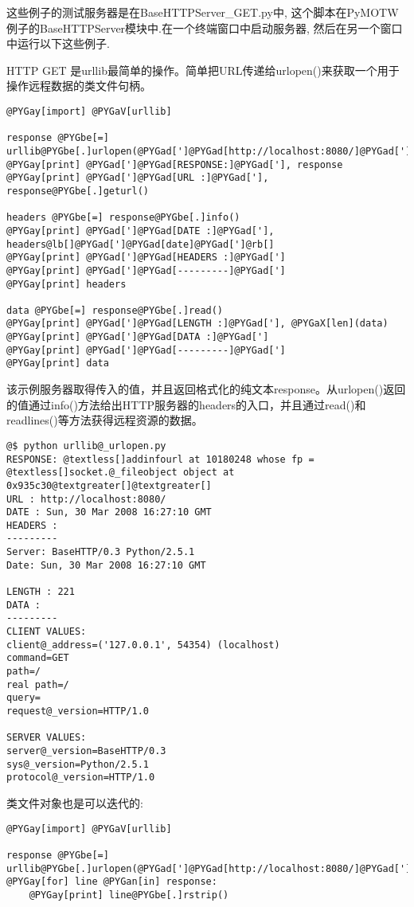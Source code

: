 \documentclass[a4paper,10pt,english]{manual}
\begin{document}
这些例子的测试服务器是在BaseHTTPServer\_GET.py中, 这个脚本在PyMOTW例子的BaseHTTPServer模块中.在一个终端窗口中启动服务器, 然后在另一个窗口中运行以下这些例子.

HTTP GET 是urllib最简单的操作。简单把URL传递给urlopen()来获取一个用于操作远程数据的类文件句柄。

\begin{Verbatim}[commandchars=@\[\]]
@PYGay[import] @PYGaV[urllib]

response @PYGbe[=] urllib@PYGbe[.]urlopen(@PYGad[']@PYGad[http://localhost:8080/]@PYGad['])
@PYGay[print] @PYGad[']@PYGad[RESPONSE:]@PYGad['], response
@PYGay[print] @PYGad[']@PYGad[URL :]@PYGad['], response@PYGbe[.]geturl()

headers @PYGbe[=] response@PYGbe[.]info()
@PYGay[print] @PYGad[']@PYGad[DATE :]@PYGad['], headers@lb[]@PYGad[']@PYGad[date]@PYGad[']@rb[]
@PYGay[print] @PYGad[']@PYGad[HEADERS :]@PYGad[']
@PYGay[print] @PYGad[']@PYGad[---------]@PYGad[']
@PYGay[print] headers

data @PYGbe[=] response@PYGbe[.]read()
@PYGay[print] @PYGad[']@PYGad[LENGTH :]@PYGad['], @PYGaX[len](data)
@PYGay[print] @PYGad[']@PYGad[DATA :]@PYGad[']
@PYGay[print] @PYGad[']@PYGad[---------]@PYGad[']
@PYGay[print] data
\end{Verbatim}

该示例服务器取得传入的值，并且返回格式化的纯文本response。从urlopen()返回的值通过info()方法给出HTTP服务器的headers的入口，并且通过read()和readlines()等方法获得远程资源的数据。

\begin{Verbatim}[commandchars=@\[\]]
@$ python urllib@_urlopen.py
RESPONSE: @textless[]addinfourl at 10180248 whose fp = @textless[]socket.@_fileobject object at 0x935c30@textgreater[]@textgreater[]
URL : http://localhost:8080/
DATE : Sun, 30 Mar 2008 16:27:10 GMT
HEADERS :
---------
Server: BaseHTTP/0.3 Python/2.5.1
Date: Sun, 30 Mar 2008 16:27:10 GMT

LENGTH : 221
DATA :
---------
CLIENT VALUES:
client@_address=('127.0.0.1', 54354) (localhost)
command=GET
path=/
real path=/
query=
request@_version=HTTP/1.0

SERVER VALUES:
server@_version=BaseHTTP/0.3
sys@_version=Python/2.5.1
protocol@_version=HTTP/1.0
\end{Verbatim}

类文件对象也是可以迭代的:

\begin{Verbatim}[commandchars=@\[\]]
@PYGay[import] @PYGaV[urllib]

response @PYGbe[=] urllib@PYGbe[.]urlopen(@PYGad[']@PYGad[http://localhost:8080/]@PYGad['])
@PYGay[for] line @PYGan[in] response:
    @PYGay[print] line@PYGbe[.]rstrip()
\end{Verbatim}
\end{document}
